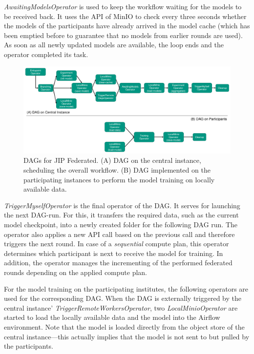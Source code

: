 \textit{AwaitingModelsOperator} is used to keep the workflow waiting for the models to be received back. It uses the API of MinIO to check every three seconds whether the models of the participants have already arrived in the model cache (which has been emptied before to guarantee that no models from earlier rounds are used). As soon as all newly updated models are available, the loop ends and the operator completed its task.

\begin{figure}
    \centerline{\includegraphics[width=1\textwidth]{1_Figures/DAG_KaapanaFed.pdf}}
    \caption[Detailed illustration of DAGs for JIP Federated]{DAGs for JIP Federated. (A) DAG on the central instance, scheduling the overall workflow. (B) DAG implemented on the participating instances to perform the model training on locally available data.}
\label{fig:DetailedDAG_KaapanaFed}
\end{figure}

\textit{TriggerMyselfOperator} is the final operator of the DAG.
It serves for launching the next DAG-run. For this, it transfers the required data, such as the current model checkpoint, into a newly created folder for the following DAG run. The operator also applies a new API call based on the previous call and therefore triggers the next round. In case of a \textit{sequential} compute plan, this operator determines which participant is next to receive the model for training. In addition, the operator manages the incrementing of the performed federated rounds depending on the applied compute plan.

For the model training on the participating institutes, the following operators are used for the corresponding DAG.
When the DAG is externally triggered by the central instance' \textit{TriggerRemoteWorkersOperator}, two \textit{LocalMinioOperator} are started to load the locally available data and the model into the Airflow environment. Note that the model is loaded directly from the object store of the central instance---this actually implies that the model is not sent to but pulled by the participants.

